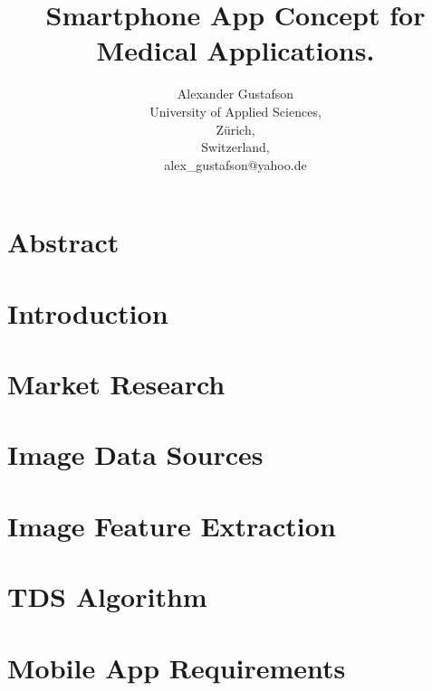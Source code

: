 \documentclass{report}
\title{Smartphone App Concept for Medical Applications.}
\author{Alexander Gustafson\\
  University of Applied Sciences,\\
  Zürich,\\
  Switzerland,\\
  alex\_gustafson@yahoo.de}
\date{\parbox{\linewidth}{\centering%
  \today\endgraf\bigskip
  Dozent: Reto Knaack (knaa@zhaw.ch)\endgraf\bigskip
  School of Engineering, Abteilung Zürich \endgraf
  Studiengang Informatik\endgraf
  }}
\begin{document}
\maketitle

\chapter*{Abstract}


\tableofcontents

\chapter{Introduction}


\chapter{Market Research}


\chapter{Image Data Sources}


\chapter{Image Feature Extraction}


\chapter{TDS Algorithm}


% 

% 

\chapter{Mobile App Requirements}

\end{document}
